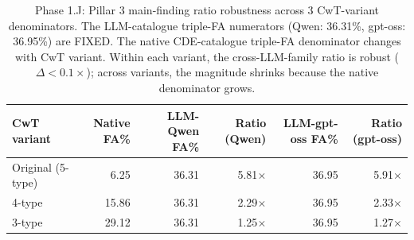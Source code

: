 \begin{table}[htbp]
\centering\small
\caption{Phase 1.J: Pillar 3 main-finding ratio robustness across 3 CwT-variant denominators. The LLM-catalogue triple-FA numerators (Qwen: 36.31\%, gpt-oss: 36.95\%) are FIXED. The native CDE-catalogue triple-FA denominator changes with CwT variant. Within each variant, the cross-LLM-family ratio is robust ($\Delta < 0.1\times$); across variants, the magnitude shrinks because the native denominator grows.}
\label{tab:phase1j_pillar3_3variants}
\begin{tabular}{lrrrrr}
\toprule
CwT variant & Native FA\% & LLM-Qwen FA\% & Ratio (Qwen) & LLM-gpt-oss FA\% & Ratio (gpt-oss) \\
\midrule
  Original (5-type) & 6.25 & 36.31 & 5.81$\times$ & 36.95 & 5.91$\times$ \\
  4-type & 15.86 & 36.31 & 2.29$\times$ & 36.95 & 2.33$\times$ \\
  3-type & 29.12 & 36.31 & 1.25$\times$ & 36.95 & 1.27$\times$ \\
\bottomrule
\end{tabular}
\end{table}
